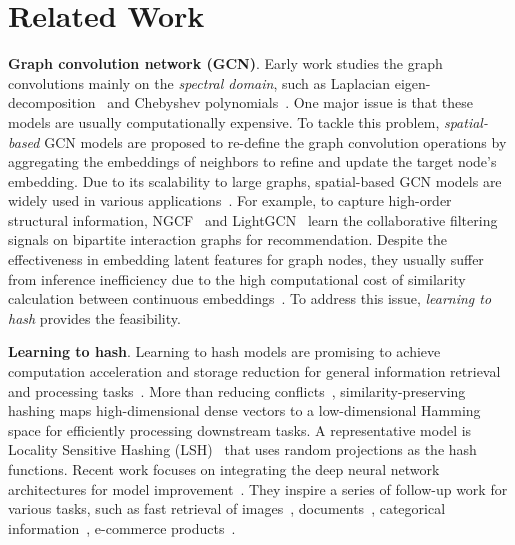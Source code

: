 \section{\textbf{Related Work}}
\label{sec:work}

{\textbf{Graph convolution network (GCN)}.}
Early work studies the graph convolutions mainly on the \textit{spectral domain}, such as Laplacian eigen-decomposition~\cite{bruna2013spectral} and Chebyshev polynomials~\cite{defferrard2016convolutional}.
One major issue is that these models are usually computationally expensive. 
To tackle this problem, \textit{spatial-based} GCN models are proposed to re-define the graph convolution operations by aggregating the embeddings of neighbors to refine and update the target node's embedding.
Due to its scalability to large graphs, spatial-based GCN models are widely used in various applications~\cite{lightgcn,ngcf,graphsage}. 
For example, to capture high-order structural information, NGCF~\cite{ngcf} and LightGCN~\cite{lightgcn} learn the collaborative filtering signals on bipartite interaction graphs for recommendation.
Despite the effectiveness in embedding latent features for graph nodes, they usually suffer from inference inefficiency due to the high computational cost of similarity calculation between continuous embeddings~\cite{hashgnn}.
To address this issue, \textit{learning to hash} provides the feasibility.


{\textbf{Learning to hash}.}
Learning to hash models are promising to achieve computation acceleration and storage reduction for general information retrieval and processing tasks~\cite{hu2021semi,hu2020selfore,li2020unsupervised,lightgcn,gao2020discern,chen2022repo4qa,ma2019hierarchical}.
More than reducing conflicts~\cite{kraska2018case},  similarity-preserving hashing maps high-dimensional dense vectors to a low-dimensional Hamming space for efficiently processing downstream tasks.
A representative model is Locality Sensitive Hashing (LSH)~\cite{lsh} that uses random projections as the hash functions.
Recent work focuses on integrating the deep neural network architectures for model improvement~\cite{wang2017survey}.
They inspire a series of follow-up work for various tasks, such as fast retrieval of images~\cite{qin2020forward,lin2017towards,hashnet}, documents~\cite{li2014two,chen2022effective}, categorical information~\cite{kang2021learning}, e-commerce products~\cite{zhang2017discrete,chen2022learning}.

